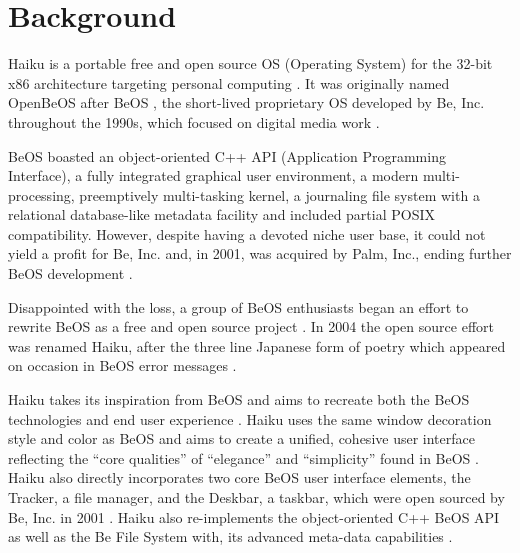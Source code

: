 \documentclass{article}
\begin{document}
\maketitle

\section{Background}

Haiku is a portable \cite{HaikuFaq} free and open source
\cite{HaikuDevFaq} OS (Operating System) for the 32-bit x86 architecture
\cite{HaikuFaq} targeting personal computing \cite{HaikuAbout}.  It
was originally named OpenBeOS after BeOS \cite{HaikuWiki}, the
short-lived proprietary OS developed by Be, Inc. throughout the 1990s,
which focused on digital media work
\cite{BeosWiki}.

BeOS boasted an object-oriented C++ API (Application Programming
Interface), a fully integrated graphical user environment, a modern
multi-processing, preemptively multi-tasking kernel, a journaling
file system with a relational database-like metadata
facility \cite{BFSWiki} and included partial POSIX compatibility.
However, despite having a devoted niche user base, it could not yield
a profit for Be, Inc. and, in 2001, was acquired by Palm, Inc., ending
further BeOS development \cite{BeosWiki}.

Disappointed with the loss, a group of BeOS enthusiasts began an
effort to rewrite BeOS as a free and open source project
\cite{BeosWiki, HaikuHistoryWiki}.  In 2004 the open source effort was
renamed Haiku, after the three line Japanese form of poetry which
appeared on occasion in BeOS error messages \cite{HaikuFaq,
HaikuHistoryWiki}.

Haiku takes its inspiration from BeOS \cite{HaikuAbout} and aims to
recreate both the BeOS technologies and end user experience
\cite{HaikuFaq}.  Haiku uses the same window decoration style and
color as BeOS \cite{HaikuWiki, BeosWiki} and aims to create a
unified, cohesive user interface \cite{HaikuAbout, HaikuHIG,
HaikuIcon} reflecting the ``core qualities'' of ``elegance'' and
``simplicity'' found in BeOS \cite{HaikuFaq}.  Haiku also directly
incorporates two core BeOS user interface elements, the Tracker, a
file manager, and the Deskbar, a taskbar, which were open sourced by
Be, Inc. in 2001 \cite{HaikuFaq}.  Haiku also re-implements the
object-oriented C++ BeOS API\cite{HaikuWiki} as well as the Be File
System with, its advanced meta-data capabilities \cite{BFSWiki}.
\end{document}
